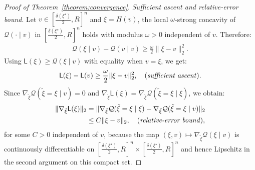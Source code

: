 \documentclass[12pt]{article}
\numberwithin{equation}{section}
\begin{document}
\begin{proof}[Proof of Theorem~\ref{theorem:convergence}]
\noindent
\emph{Sufficient ascent and relative-error bound}. Let $v \in \left[\tfrac{\delta(\xi^{\star})}{2}, R\right]^{n}$ and $\xi = H(v)$, the local $\omega$-strong concavity of $\mathcal{Q}(\cdot \mid v)$ in $\left[\tfrac{\delta(\xi^{\star})}{2}, R\right]^{n}$ holds with modulus $\omega > 0$ independent of $v$. Therefore:
\begin{align}\label{eq:P.2}
    \mathcal{Q}(\xi\mid v) - \mathcal{Q}(v\mid v) \geq \frac{\omega}{2}\lVert \xi - v\rVert^{2}_2.
\end{align}
Using $\mathsf{L}(\xi) \geq \mathcal{Q}(\xi\mid v)$ with equality when $v=\xi$, we get:
\begin{align}\label{eq:P.3}
    \mathsf{L}(\xi) - \mathsf{L}(v) \geq \frac{\omega}{2}\lVert \xi - v\rVert^{2}_2,\quad (\text{\textit{sufficient ascent}}).
\end{align}
Since $\nabla_{\tilde{\xi}} \mathcal{Q}(\tilde{\xi}=\xi\mid v) = 0$ and $\nabla_{\tilde{\xi}} \mathsf{L}(\xi) = \nabla_{\tilde{\xi}}\mathcal{Q}(\tilde{\xi}=\xi\mid\xi)$, we obtain:
\begin{align}\label{eq:P.4}
\begin{split}
    \lVert \nabla_{\tilde{\xi}} \mathsf{L}(\xi)\rVert_2 &= \lVert \nabla_{\tilde{\xi}} \mathcal{Q}(\tilde{\xi}=\xi\mid \xi) - \nabla_{\tilde{\xi}}\mathcal{Q}(\tilde{\xi}=\xi\mid v)\rVert_2\\
    &\leq C\lVert \xi - v\rVert_2,\quad (\text{\textit{relative-error bound}}),
\end{split}
\end{align}
for some $C>0$ independent of $v$, because the map $(\xi, v) \mapsto \nabla_{\tilde{\xi}}\mathcal{Q}(\xi \mid v)$ is continuously differentiable on $ \left[\tfrac{\delta(\xi^{\star})}{2}, R\right]^{n}\times  \left[\tfrac{\delta(\xi^{\star})}{2}, R\right]^{n}$ and hence Lipschitz in the second argument on  this compact set.


\end{proof}
\end{document}
